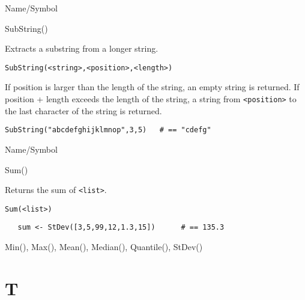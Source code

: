 \begin{desc}{Name/Symbol}
\item[Name/Symbol]  	SubString()

\item[Description]  	Extracts a substring from a longer string.

\item[Usage]
\begin{verbatim}
SubString(<string>,<position>,<length>)
\end{verbatim}
 If position is
	      	larger than the length of the string, an empty string is
	      	returned.  If position + length exceeds the length of
      	the string, a string from \verb+<position>+ to the last character of 
	the string is returned.

\item[Example]
\begin{verbatim}
SubString("abcdefghijklmnop",3,5)	# == "cdefg"
\end{verbatim}

\item[See Also]	
\end{desc}

\rl





\begin{desc}{Name/Symbol}
\item[Name/Symbol]  	Sum() 

\item[Description]  Returns the sum  of \verb+<list>+.

\item[Usage]       	
\begin{verbatim}
Sum(<list>)        
\end{verbatim}

\item[Example]	
\begin{verbatim}
   sum <- StDev([3,5,99,12,1.3,15])      # == 135.3
\end{verbatim}

\item[See Also]     	Min(), Max(), Mean(), Median(), Quantile(), StDev()
\end{desc}

\rl

\section{T}
\rl

